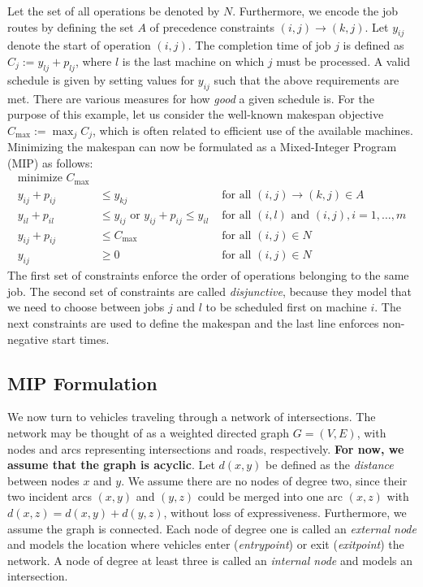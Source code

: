 \documentclass{article}
\theoremstyle{definition}
\theoremstyle{plain}
\begin{document}
Let the set of all operations be denoted by $N$. Furthermore, we encode the job
routes by defining the set $A$ of precedence constraints
$(i,j) \xrightarrow{} (k,j)$. Let $y_{ij}$ denote the start of operation
$(i,j)$. The completion time of job $j$ is defined as
$C_{j} := y_{lj} + p_{lj}$, where $l$ is the last machine on which $j$ must be
processed. A valid schedule is given by setting values for $y_{ij}$ such that
the above requirements are met. There are various measures for how \textit{good}
a given schedule is. For the purpose of this example, let us consider the
well-known makespan objective $C_{\text{max}} := \max_{j} C_{j}$, which is often
related to efficient use of the available machines. Minimizing the makespan can
now be formulated as a Mixed-Integer Program (MIP) as follows:
%
\begin{align*}
  \text{minimize } C_{\text{max}} \\
  y_{ij} + p_{ij} &\leq y_{kj}  & \text{ for all } (i,j) \xrightarrow{} (k,j) \in A \\
  y_{il} + p_{il} &\leq  y_{ij} \text{ or } y_{ij} + p_{ij} \leq y_{il}  & \text{ for all } (i,l) \text{ and } (i,j), i =1, \dots,m \\
  y_{ij} + p_{ij} &\leq C_{\text{max}} & \text{ for all } (i,j) \in N \\
  y_{ij} &\geq 0 & \text{ for all } (i,j) \in N
\end{align*}
%
The first set of constraints enforce the order of operations belonging to the
same job. The second set of constraints are called \textit{disjunctive}, because
they model that we need to choose between jobs $j$ and $l$ to be scheduled first
on machine $i$. The next constraints are used to define the makespan and the
last line enforces non-negative start times.


\subsection{MIP Formulation}
We now turn to vehicles traveling through a network of intersections. The
network may be thought of as a weighted directed graph $G=(V,E)$, with nodes and
arcs representing intersections and roads, respectively. \textbf{For now, we
  assume that the graph is acyclic}. Let $d(x,y)$ be defined as the
\textit{distance} between nodes $x$ and $y$. We assume there are no nodes of
degree two, since their two incident arcs $(x,y)$ and $(y,z)$ could be merged
into one arc $(x,z)$ with $d(x,z) = d(x,y) + d(y,z)$, without loss of
expressiveness. Furthermore, we assume the graph is connected. Each node of
degree one is called an \textit{external node} and models the location where
vehicles enter (\textit{entrypoint}) or exit (\textit{exitpoint}) the network. A
node of degree at least three is called an \textit{internal node} and models an
intersection.
\end{document}
